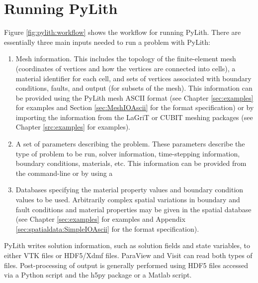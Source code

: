 
\chapter{Running PyLith}

Figure \vref{fig:pylith:workflow} shows the workflow for running PyLith.
There are essentially three main inputs needed to run a problem with
PyLith:
\begin{enumerate}
\item Mesh information. This includes the topology of the
  finite-element mesh (coordinates of vertices and how the vertices
  are connected into cells), a material identifier for each cell, and
  sets of vertices associated with boundary conditions, faults, and
  output (for subsets of the mesh). This information can be provided
  using the PyLith mesh ASCII format (see Chapter \vref{sec:examples}
  for examples and Section \vref{sec:MeshIOAscii} for the format
  specification) or by importing the information from the LaGriT or
  CUBIT meshing packages (see Chapter \vref{src:examples} for
  examples).
\item A set of parameters describing the problem. These parameters
  describe the type of problem to be run, solver information,
  time-stepping information, boundary conditions, materials, etc. This
  information can be provided from the command-line or by using a
\item Databases specifying the material property values and boundary
  condition values to be used. Arbitrarily complex spatial variations
  in boundary and fault conditions and material properties may be
  given in the spatial database (see Chapter \vref{sec:examples} for
  examples and Appendix \vref{sec:spatialdata:SimpleIOAscii} for the
  format specification).
\end{enumerate}
PyLith writes solution information, such as solution fields and state
variables, to either VTK files or HDF5/Xdmf files. ParaView and Visit
can read both types of files. Post-processing of output is generally
performed using HDF5 files accessed via a Python script and the h5py
package or a Matlab script.

